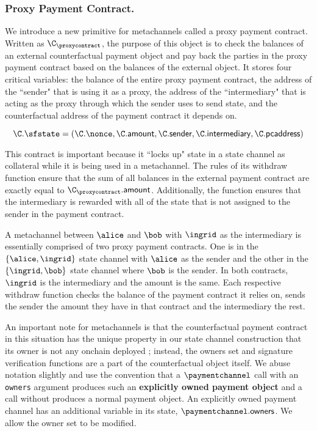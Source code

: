 \documentclass[prb,floatfix,reprint,nofootinbib,amsmath,amssymb,epsfig,pre,floats,letterpaper,groupedaffiliation,tightenlines,allcolors=blue,11pt]{revtex4}
\theoremstyle{definition}
\theoremstyle{definition}
\theoremstyle{definition}
\begin{document}
\subsubsection{Proxy Payment Contract.}

We introduce a new primitive for metachannels called a proxy payment contract. Written as $\C_\proxycontract$, the purpose of this object is to check the balances of an external counterfactual payment object and pay back the parties in the proxy payment contract based on the balances of the external object. It stores four critical variables: the balance of the entire proxy payment contract, the address of the ``sender" that is using it as a proxy, the address of the ``intermediary" that is acting as the proxy through which the sender uses to send state, and the counterfactual address of the payment contract it depends on.

\[ \C.\sfstate = (\C.\nonce, \C.\textsf{amount}, \C.\textsf{sender}, \C.\textsf{intermediary}, \C.\textsf{pcaddress}) \]

This contract is important because it ``locks up" state in a state channel as collateral while it is being used in a metachannel. The rules of its \textsf{withdraw} function ensure that the sum of all balances in the external payment contract are exactly equal to $\C_\proxycontract.\textsf{amount}$. Additionally, the function ensures that the intermediary is rewarded with all of the state that is not assigned to the sender in the payment contract.

A metachannel between $\alice$ and $\bob$ with $\ingrid$ as the intermediary is essentially comprised of two proxy payment contracts. One is in the $\{\alice, \ingrid\}$ state channel with $\alice$ as the sender and the other in the $\{\ingrid, \bob\}$ state channel where $\bob$ is the sender. In both contracts, $\ingrid$ is the intermediary and the \textsf{amount} is the same. Each respective \textsf{withdraw} function checks the balance of the payment contract it relies on, sends the sender the amount they have in that contract and the intermediary the rest.

An important note for metachannels is that the counterfactual payment contract in this situation has the unique property in our state channel construction that its owner is not any onchain deployed \multisig; instead, the owners set and signature verification functions are a part of the counterfactual object itself. We abuse notation slightly and use the convention that a $\paymentchannel$ call with an \texttt{owners} argument produces such an \textbf{explicitly owned payment object} and a call without produces a normal payment object. An explicitly owned payment channel has an additional variable in its state, $\paymentchannel.\textsf{owners}$. We allow the owner set to be modified.
\end{document}
